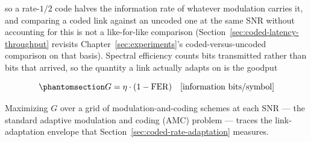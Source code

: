 so a rate-$1/2$ code halves the information rate of whatever modulation carries it, and comparing a coded
link against an uncoded one at the same SNR without accounting for this is not a like-for-like comparison
(Section~\ref{sec:coded-latency-throughput} revisits Chapter~\ref{sec:experiments}'s coded-versus-uncoded
comparison on that basis). Spectral efficiency counts bits transmitted rather than bits that arrived, so the
quantity a link actually adapts on is the goodput

\begin{equation}\protect\phantomsection\label{eq:goodput}{G = \eta \cdot (1 - \mathrm{FER}) \quad \text{[information bits/symbol]}}\end{equation}

Maximizing $G$ over a grid of modulation-and-coding schemes at each SNR --- the standard adaptive modulation
and coding (AMC) problem --- traces the link-adaptation envelope that Section~\ref{sec:coded-rate-adaptation}
measures.
